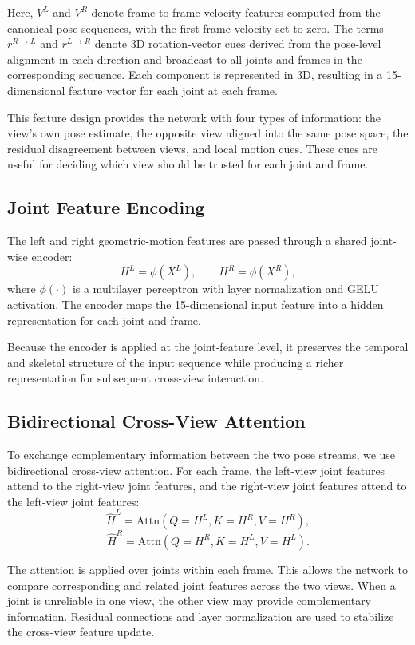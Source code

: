 \documentclass[sigconf,screen]{acmart}
\begin{document}
Here, \(V^{L}\) and \(V^{R}\) denote frame-to-frame velocity features computed from the canonical pose sequences, with the first-frame velocity set to zero. The terms \(r^{R \rightarrow L}\) and \(r^{L \rightarrow R}\) denote 3D rotation-vector cues derived from the pose-level alignment in each direction and broadcast to all joints and frames in the corresponding sequence. Each component is represented in 3D, resulting in a 15-dimensional feature vector for each joint at each frame.

This feature design provides the network with four types of information: the view's own pose estimate, the opposite view aligned into the same pose space, the residual disagreement between views, and local motion cues. These cues are useful for deciding which view should be trusted for each joint and frame.

\subsection{Joint Feature Encoding}
\label{subsec:joint_feature_encoding}

The left and right geometric-motion features are passed through a shared joint-wise encoder:
\[
H^{L} = \phi(X^{L}),
\qquad
H^{R} = \phi(X^{R}),
\]
where \(\phi(\cdot)\) is a multilayer perceptron with layer normalization and GELU activation. The encoder maps the 15-dimensional input feature into a hidden representation for each joint and frame.

Because the encoder is applied at the joint-feature level, it preserves the temporal and skeletal structure of the input sequence while producing a richer representation for subsequent cross-view interaction.

\subsection{Bidirectional Cross-View Attention}
\label{subsec:cross_view_attention}

To exchange complementary information between the two pose streams, we use bidirectional cross-view attention. For each frame, the left-view joint features attend to the right-view joint features, and the right-view joint features attend to the left-view joint features:
\[
\hat{H}^{L}
=
\mathrm{Attn}(Q=H^{L}, K=H^{R}, V=H^{R}),
\]
\[
\hat{H}^{R}
=
\mathrm{Attn}(Q=H^{R}, K=H^{L}, V=H^{L}).
\]

The attention is applied over joints within each frame. This allows the network to compare corresponding and related joint features across the two views. When a joint is unreliable in one view, the other view may provide complementary information. Residual connections and layer normalization are used to stabilize the cross-view feature update.
\end{document}
